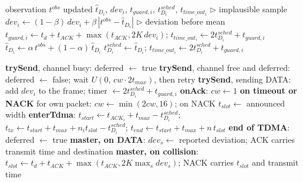 \documentclass{article}
\newcommand{\COMMENTR}[1]{\hfill $\triangleright$ #1}
\begin{document}
\begin{algorithm}[H]
\caption{Delay observation (\texttt{delaySample}) [P]}
\label{alg:delay}
\begin{algorithmic}[1]
\REQUIRE observation $t^{obs}$
\ENSURE updated $\hat t_{D_i}$, $dev_i$, $t_{guard,i}$, $t^{sched}_{D_i}$, $t_{time\_out_i}$
    \RETURN \COMMENTR{implausible sample}
\ENDIF
\STATE $dev_i \leftarrow (1-\beta)\,dev_i + \beta\,|t^{obs} - \hat t_{D_i}|$ \COMMENTR{deviation before mean}
\STATE $t_{guard,i} \leftarrow t_d + t_{ACK} + \max(t_{ACK}, 2K\,dev_i)$; \; $t_{time\_out_i} \leftarrow 2t^{sched}_{D_i} + t_{guard,i}$
\STATE $\hat t_{D_i} \leftarrow \alpha\, t^{obs} + (1-\alpha)\,\hat t_{D_i}$
    \STATE $t^{sched}_{D_i} \leftarrow \hat t_{D_i}$; \; $t_{time\_out_i} \leftarrow 2t^{sched}_{D_i} + t_{guard,i}$
\ENDIF
\end{algorithmic}
\end{algorithm}

\begin{algorithm}[H]
\caption{Modifications to the ARQ\_HMAC handlers (only the changed lines)}
\label{alg:mods}
\begin{algorithmic}[1]
\STATE \textbf{trySend}, channel busy: deferred $\leftarrow$ true
\STATE \textbf{trySend}, channel free and deferred: deferred $\leftarrow$ false; wait $U(0,\, cw \cdot 2t_{max})$, then retry
\STATE \textbf{trySend}, sending DATA: add $dev_i$ to the frame; timer $\leftarrow 2t^{sched}_{D_i} + t_{guard,i}$
\STATE \textbf{onAck}: $cw \leftarrow 1$
\STATE \textbf{on timeout or NACK} for own packet: $cw \leftarrow \min(2cw, 16)$; on NACK $t_{slot} \leftarrow$ announced width
\STATE \textbf{enterTdma}: $t_{start} \leftarrow t_{ACK_i} + t_{max} - t^{sched}_{D_i}$; \; $t_{tx} \leftarrow t_{start} + t_{max} + n_i t_{slot} - t^{sched}_{D_i}$; \; $t_{end} \leftarrow t_{start} + t_{max} + n\,t_{slot}$
\STATE \textbf{end of TDMA}: deferred $\leftarrow$ true
\STATE \textbf{master, on DATA}: $dev_s \leftarrow$ reported deviation; ACK carries transmit time and destination
\STATE \textbf{master, on collision}: $t_{slot} \leftarrow t_d + t_{ACK} + \max(t_{ACK}, 2K \max_s dev_s)$; NACK carries $t_{slot}$ and transmit time
\end{algorithmic}
\end{algorithm}
\end{document}
